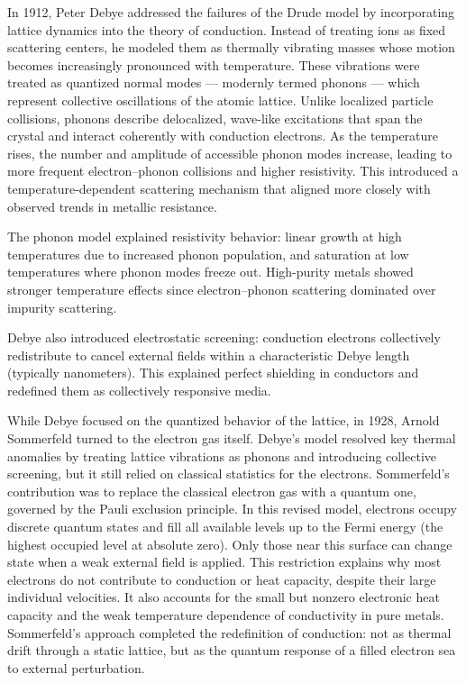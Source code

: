 In 1912, Peter Debye addressed the failures of the Drude model by incorporating lattice dynamics into the theory of conduction. Instead of treating ions as fixed scattering centers, he modeled them as thermally vibrating masses whose motion becomes increasingly pronounced with temperature. These vibrations were treated as quantized normal modes — modernly termed phonons — which represent collective oscillations of the atomic lattice. Unlike localized particle collisions, phonons describe delocalized, wave-like excitations that span the crystal and interact coherently with conduction electrons. As the temperature rises, the number and amplitude of accessible phonon modes increase, leading to more frequent electron–phonon collisions and higher resistivity. This introduced a temperature-dependent scattering mechanism that aligned more closely with observed trends in metallic resistance.

The phonon model explained resistivity behavior: linear growth at high temperatures due to increased phonon population, and saturation at low temperatures where phonon modes freeze out. High-purity metals showed stronger temperature effects since electron–phonon scattering dominated over impurity scattering.

Debye also introduced electrostatic screening: conduction electrons collectively redistribute to cancel external fields within a characteristic Debye length (typically nanometers). This explained perfect shielding in conductors and redefined them as collectively responsive media.

While Debye focused on the quantized behavior of the lattice, in 1928, Arnold Sommerfeld turned to the electron gas itself. Debye's model resolved key thermal anomalies by treating lattice vibrations as phonons and introducing collective screening, but it still relied on classical statistics for the electrons. Sommerfeld's contribution was to replace the classical electron gas with a quantum one, governed by the Pauli exclusion principle. In this revised model, electrons occupy discrete quantum states and fill all available levels up to the Fermi energy (the highest occupied level at absolute zero). Only those near this surface can change state when a weak external field is applied. This restriction explains why most electrons do not contribute to conduction or heat capacity, despite their large individual velocities. It also accounts for the small but nonzero electronic heat capacity and the weak temperature dependence of conductivity in pure metals. Sommerfeld's approach completed the redefinition of conduction: not as thermal drift through a static lattice, but as the quantum response of a filled electron sea to external perturbation.

